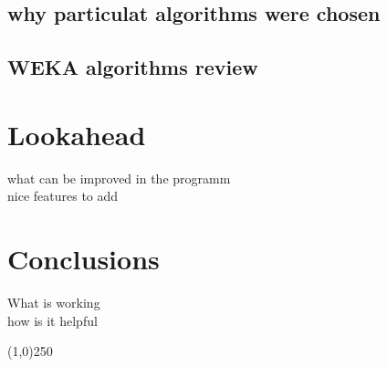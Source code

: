 \documentclass[11pt, letterpaper]{article}            %
\begin{document}
\subsection{why particulat algorithms were chosen}
\subsection{WEKA algorithms review}

\section{Lookahead}
what can be improved in the programm\\
nice features to add\\

\section{Conclusions}
What is working\\
how is it helpful



\begin{center} \noindent \line(1,0){250} \end{center}	    %


\newpage								 								 %
{}

\end{document}
